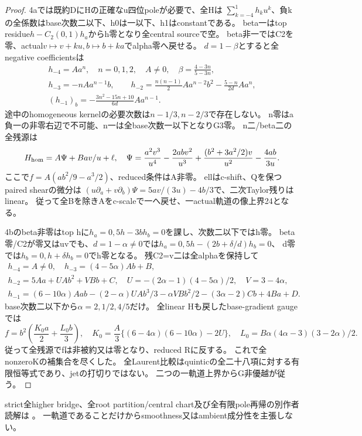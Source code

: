\documentclass[a4paper,11pt]{ltjsarticle}
\theoremstyle{definition}
\begin{document}
\begin{proof}
4aでは既約DにHの正確なu四位poleが必要で、全Hは
$\sum_{k=-4}^{1}h_ku^k$、負kの全係数はbase次数二以下、h0は一以下、h1はconstantである。
beta一はtop residue$h-C_2(0,1)h_a$からh零となり全central sourceで空。
beta非一ではC2を零、actual$v\mapsto v+ku,b\mapsto b+ka$でalpha零へ戻せる。
$d=1-\beta$とすると全negative coefficientsは
\[
\begin{gathered}
 h_{-4}=Aa^n,\quad n=0,1,2,\quad A\ne0,\quad
 \beta=\frac{4-3n}{5-3n},\\
 h_{-3}=-nAa^{n-1}b,\qquad
 h_{-2}=\frac{n(n-1)}2Aa^{n-2}b^2-\frac{5-n}{2d}Aa^n,\\
 (h_{-1})_b=-\frac{3n^2-15n+10}{6d}Aa^{n-1}.
\end{gathered}
\]
途中のhomogeneous kernelの必要次数は$n-1/3,n-2/3$で存在しない。
n零はa負一の非零右辺で不可能、n一は全base次数一以下となりG3零。
n二/beta二の全残源は
\[
 H_{\rm hom}=A\Psi+Bav/u+\ell,\quad
 \Psi=\frac{a^2v^3}{u^4}-\frac{2abv^2}{u^3}
       +\frac{(b^2+3a^2/2)v}{u^2}-\frac{4ab}{3u}.
\]
ここで$f=A(ab^2/9-a^3/2)$、reduced条件はA非零。
ellはc-shift、Qを保つpaired shearの微分は
$(u\partial_a+v\partial_b)\Psi=5av/(3u)-4b/3$で、二次Taylor残りはlinear。
従って全Bを除きAをc-scaleで一へ戻せ、一actual軌道の像上界24となる。

4bのbeta非零はtop hに$h_a=0,5h-3bh_b=0$を課し、次数二以下ではh零。
beta零/C2が零又はuvでも、$d=1-\alpha\ne0$では$h_a=0,5h-(2b+\delta/d)h_b=0$、
d零では$h_b=0,h+\delta h_b=0$でh零となる。
残C2=v二は全alphaを保持して
\[
\begin{gathered}
 h_{-4}=A\ne0,\quad h_{-3}=(4-5\alpha)Ab+B,\\
 h_{-2}=5Aa+UAb^2+VBb+C,\quad
 U=-(2\alpha-1)(4-5\alpha)/2,\quad V=3-4\alpha,\\
 h_{-1}=(6-10\alpha)Aab-(2-\alpha)UAb^3/3
       -\alpha VBb^2/2-(3\alpha-2)Cb+4Ba+D.
\end{gathered}
\]
base次数二以下から$\alpha=2,1/2,4/5$だけ。
全linear Hも戻したbase-gradient gaugeでは
\[
 f=b^2\left(\frac{K_0a}{2}+\frac{L_0b}{3}\right),\quad
 K_0=\frac A3\{(6-4\alpha)(6-10\alpha)-2U\},\quad
 L_0=B\alpha(4\alpha-3)(3-2\alpha)/2.
\]
従って全残源でfは非被約又は零となり、reduced Rに反する。
これで全nonzeroKの補集合を尽くした。
全Laurent比較はquinticの全二十八項に対する有限恒等式であり、jetの打切りではない。
二つの一軌道上界からG非優越が従う。
\end{proof}
strict全higher bridge、全root partition/central chart及び全有限pole再帰の別作者読解は
。
一軌道であることだけからsmoothness又はambient成分性を主張しない。
\end{document}
